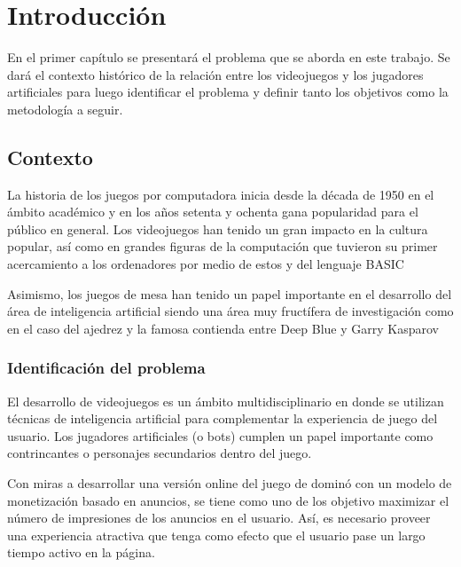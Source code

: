 \chapter*{Introducción}


\noindent 

En el primer capítulo se presentará el problema que se aborda en este trabajo. Se dará el 
contexto histórico de la relación entre los videojuegos y los jugadores artificiales para luego 
identificar el problema y definir tanto los objetivos como la metodología a seguir.

\section{Contexto}

La historia de los juegos por computadora inicia desde la década de 1950 en el ámbito 
académico y en los años setenta y ochenta gana popularidad para el público en general. Los 
videojuegos han tenido un gran impacto en la cultura popular, así como en grandes figuras 
de la computación que tuvieron su primer acercamiento a los ordenadores por medio de 
estos y del lenguaje BASIC

Asimismo, los juegos de mesa han tenido un papel importante en el desarrollo del área de 
inteligencia artificial siendo una área muy fructífera de investigación como en el caso del 
ajedrez y la famosa contienda entre Deep Blue y Garry Kasparov

\subsection{Identificación del problema}

 El desarrollo de videojuegos es un ámbito multidisciplinario en donde se utilizan técnicas 
de inteligencia artificial para complementar la experiencia de juego del usuario. Los 
jugadores artificiales (o bots) cumplen un papel importante como contrincantes o 
personajes secundarios dentro del juego. 

Con miras a desarrollar una versión online del juego de dominó con un modelo de 
monetización basado en anuncios, se tiene como uno de los objetivo maximizar el número 
de impresiones de los anuncios en el usuario. Así, es necesario proveer una experiencia 
atractiva que tenga como efecto que el usuario pase un largo tiempo activo en la página.

